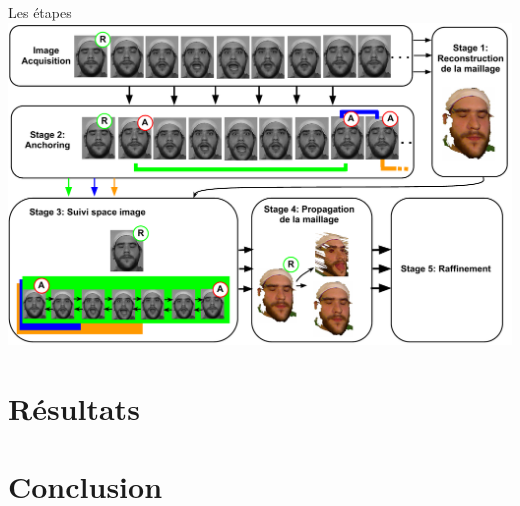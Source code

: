 \documentclass[compress,pdf,11pt,xcolor=dvipsnames]{beamer}
\begin{document}
\begin{frame}{Les étapes}
    \includegraphics[width=\textwidth]{img/projDiagram}
\end{frame}


\section{Résultats}
\begin{frame}{}
\end{frame}{}


\section{Conclusion}
\end{document}
